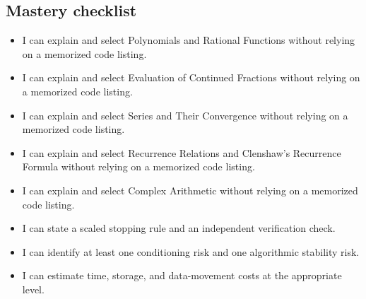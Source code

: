 \documentclass[10pt,letterpaper]{article}
\begin{document}
\subsection*{Mastery checklist}
\begin{itemize}
\item[$\square$] I can explain and select Polynomials and Rational Functions without relying on a memorized code listing.
\item[$\square$] I can explain and select Evaluation of Continued Fractions without relying on a memorized code listing.
\item[$\square$] I can explain and select Series and Their Convergence without relying on a memorized code listing.
\item[$\square$] I can explain and select Recurrence Relations and Clenshaw's Recurrence Formula without relying on a memorized code listing.
\item[$\square$] I can explain and select Complex Arithmetic without relying on a memorized code listing.
\item[$\square$] I can state a scaled stopping rule and an independent verification check.
\item[$\square$] I can identify at least one conditioning risk and one algorithmic stability risk.
\item[$\square$] I can estimate time, storage, and data-movement costs at the appropriate level.
\end{itemize}
\end{document}
